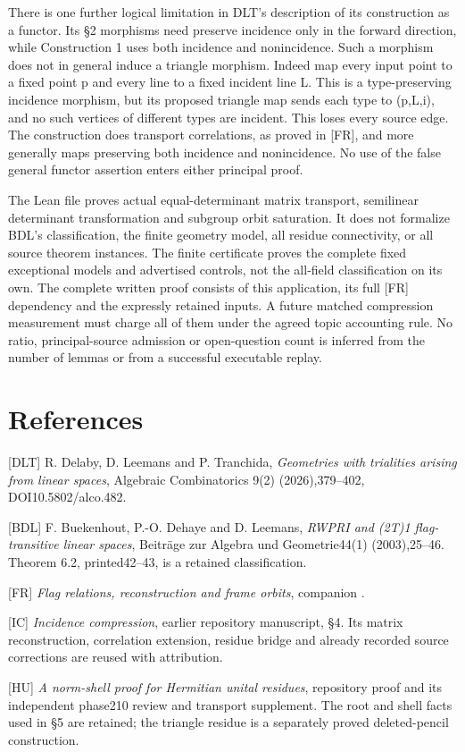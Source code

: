 \documentclass[
  11pt,
  a4paper,
]{article}
\renewcommand{\texttt}[1]{{\ttfamily\seqsplit{#1}}}
\begin{document}
There is one further logical limitation in DLT's description of its
construction as a functor. Its §2 morphisms need preserve incidence only
in the forward direction, while Construction 1 uses both incidence and
nonincidence. Such a morphism does not in general induce a triangle
morphism. Indeed map every input point to a fixed point p and every line
to a fixed incident line L. This is a type-preserving incidence
morphism, but its proposed triangle map sends each type to (p,L,i), and
no such vertices of different types are incident. This loses every
source edge. The construction does transport correlations, as proved in
{[}FR{]}, and more generally maps preserving both incidence and
nonincidence. No use of the false general functor assertion enters
either principal proof.

The Lean file proves actual equal-determinant matrix transport,
semilinear determinant transformation and subgroup orbit saturation. It
does not formalize BDL's classification, the finite geometry model, all
residue connectivity, or all source theorem instances. The finite
certificate proves the complete fixed exceptional models and advertised
controls, not the all-field classification on its own. The complete
written proof consists of this application, its full {[}FR{]} dependency
and the expressly retained inputs. A future matched compression
measurement must charge all of them under the agreed topic accounting
rule. No ratio, principal-source admission or open-question count is
inferred from the number of lemmas or from a successful executable
replay.

\section{References}\label{references}

{[}DLT{]} R. Delaby, D. Leemans and P. Tranchida, \emph{Geometries with
trialities arising from linear spaces}, Algebraic Combinatorics 9(2)
(2026),379--402, DOI10.5802/alco.482.

{[}BDL{]} F. Buekenhout, P.-O. Dehaye and D. Leemans, \emph{RWPRI and
(2T)1 flag-transitive linear spaces}, Beiträge zur Algebra und
Geometrie44(1) (2003),25--46. Theorem 6.2, printed42--43, is a retained
classification.

{[}FR{]} \emph{Flag relations, reconstruction and frame orbits},
companion \texttt{phase265\_flag\_relations.md}.

{[}IC{]} \emph{Incidence compression}, earlier repository manuscript,
§4. Its matrix reconstruction, correlation extension, residue bridge and
already recorded source corrections are reused with attribution.

{[}HU{]} \emph{A norm-shell proof for Hermitian unital residues},
repository proof and its independent phase210 review and transport
supplement. The root and shell facts used in §5 are retained; the
triangle residue is a separately proved deleted-pencil construction.
\end{document}
